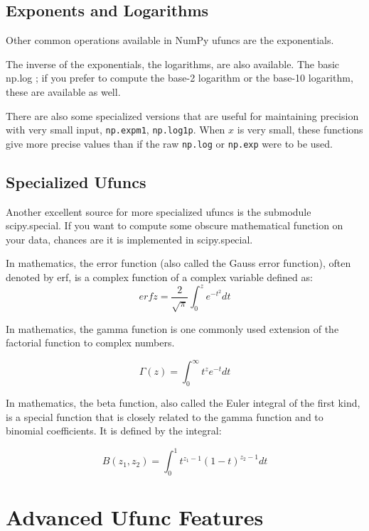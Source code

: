 \subsection*{Exponents and Logarithms}
Other common operations available in NumPy ufuncs are the exponentials.

The inverse of the exponentials, the logarithms, are also available. The basic np.log
; if you prefer to compute the base-2 logarithm or the
base-10 logarithm, these are available as well.

There are also some specialized versions that are useful for maintaining precision
with very small input, \verb|np.expm1|, \verb|np.log1p|. When $x$ is very small, these functions give more precise values than if the raw \verb|np.log|
or \verb|np.exp| were to be used.

\subsection*{Specialized Ufuncs}

Another excellent source for more specialized ufuncs is the submodule scipy.special. If you want to compute some obscure mathematical function on your data,
chances are it is implemented in scipy.special.

In mathematics, the error function (also called the Gauss error function), often denoted by erf, is a complex function of a complex variable defined as:
\begin{equation*}
    erf z = \frac{2}{\sqrt{\pi}}\int_0^ze^{-t^2}dt
\end{equation*}

In mathematics, the gamma function is one commonly used extension of the factorial function to complex numbers.

\begin{equation*}
    \Gamma(z)=\int_0^{\infty}t^ze^{-t}dt
\end{equation*}

In mathematics, the beta function, also called the Euler integral of the first kind, is a special function that is closely related to the gamma function and to binomial coefficients. It is defined by the integral:

\begin{equation*}
    B(z_1, z_2)=\int_0^1t^{z_1-1}(1-t)^{z_2-1}dt
\end{equation*}

\section{Advanced Ufunc Features}
